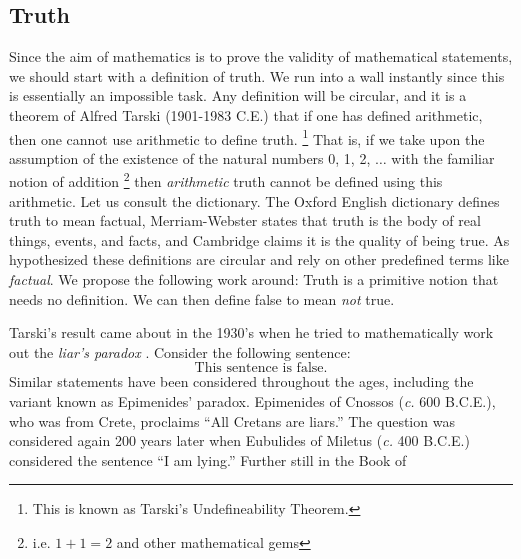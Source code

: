     \subsection{Truth}
        Since the aim of mathematics is to prove the validity of mathematical
        statements, we should start with a definition of truth. We run into a
        wall instantly since this is essentially an impossible task. Any
        definition will be circular, and it is a theorem of
        Alfred Tarski (1901-1983 C.E.) that if one has
        defined arithmetic, then one cannot use arithmetic to define
        truth.%
        \footnote{%
            This is known as Tarski's Undefineability Theorem.%
        }
        That is, if we take upon the assumption of the existence of the
        natural numbers 0, 1, 2, $\dots$ with the familiar notion of addition%
        \footnote{%
            i.e. $1+1=2$ and other mathematical gems
         }
        then \textit{arithmetic} truth cannot be defined using this arithmetic.
        Let us consult the dictionary. The Oxford English dictionary defines
        truth to mean factual, Merriam-Webster states that truth is the body of
        real things, events, and facts, and Cambridge claims it is the quality
        of being true. As hypothesized these definitions are circular and rely
        on other predefined terms like \textit{factual}. We propose the
        following work around: Truth is a primitive notion that
        needs no definition. We can then define false to mean
        \textit{not} true.
        \par\hfill\par
        Tarski's result came about in the 1930's when he tried to mathematically
        work out the \textit{liar's paradox}%
        . Consider the following sentence:
        \begin{equation}
            \text{This sentence is false.}
        \end{equation}
        Similar statements have been considered throughout the ages, including
        the variant known as Epimenides' paradox.
        Epimenides of Cnossos (\textit{c.} 600 B.C.E.), who was from Crete,
        proclaims ``All Cretans are liars.'' The question was considered again
        200 years later when Eubulides of Miletus (\textit{c.} 400 B.C.E.)
        considered the sentence ``I am lying.'' Further still in the Book of
